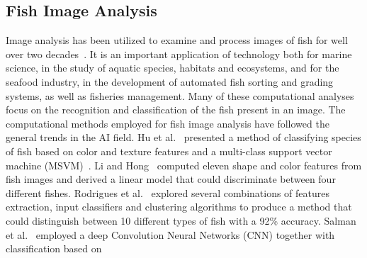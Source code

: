 \documentclass[conference]{IEEEtran}
\begin{document}
\subsection{Fish Image Analysis}

Image analysis has been utilized to examine and process images of fish
for well over two decades~\cite{Zion2000InvivoFS,Saberioon2017ApplicationOM}. It is an important
application of technology both for marine science, in the study of aquatic
species, habitats and ecosystems, and for the seafood industry, in the
development of automated fish sorting and grading systems, as well as
fisheries management. Many of these computational analyses focus on
the recognition and classification
of the fish present in an image.  The computational methods employed for
fish image analysis have followed the general trends in the AI field.
Hu et al.~\cite{HuJing2012Fscb} presented a method of classifying species
of fish based on color and texture features and a multi-class support
vector machine (MSVM)~\cite{Vapnik1999AOS}.
Li and Hong~\cite{Li2014IdentificationOF} computed eleven shape and color
features from fish images and derived a linear model
that could discriminate between four different fishes.
Rodrigues et al.~\cite{RodriguesMarcoT.A2015Ecda} explored several
combinations of features extraction, input classifiers and clustering
algorithms to produce a method that could distinguish between 10 different
types of fish with a 92\% accuracy.
Salman et al.~\cite{Salman2016FishSC} employed a deep Convolution Neural
Networks (CNN) \cite{LeCun2004LMG} together with classification based on
\end{document}
